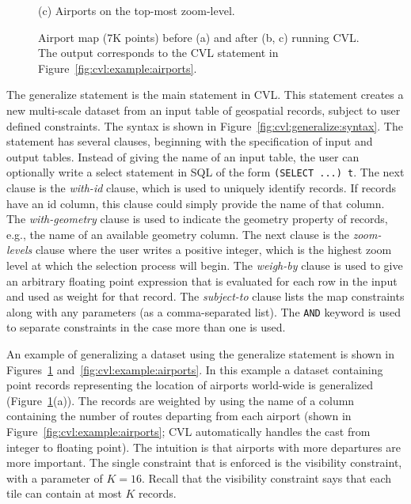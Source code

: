 \documentclass[11pt, oneside]{report}
\begin{document}
\begin{figure}[tb]
\begin{minipage}{0.329\linewidth}
    \centerline{(c) Airports on the top-most zoom-level.}
  \end{minipage}
  \vspace{-0ex}
  \caption{Airport map (7K points) before (a) and after (b, c) running CVL. The output corresponds to the CVL statement in Figure~\ref{fig:cvl:example:airports}.}
  \label{fig:cvl:visualization:airport}
  \vspace{-2ex}
\end{figure}

The generalize statement is the main statement in CVL. This statement creates a new multi-scale dataset from an input table of geospatial records, subject to user defined constraints. The syntax is shown in Figure~\ref{fig:cvl:generalize:syntax}. The statement has several clauses, beginning with the specification of input and output tables. Instead of giving the name of an input table, the user can optionally write a select statement in SQL of the form \texttt{(SELECT ...) t}. The next clause is the \emph{with-id} clause, which is used to uniquely identify records. If records have an id column, this clause could simply provide the name of that column. The \emph{with-geometry} clause is used to indicate the geometry property of records, e.g., the name of an available geometry column. The next clause is the \emph{zoom-levels} clause where the user writes a positive integer, which is the highest zoom level at which the selection process will begin. The \emph{weigh-by} clause is used to give an arbitrary floating point expression that is evaluated for each row in the input and used as weight for that record. The \emph{subject-to} clause lists the map constraints along with any parameters (as a comma-separated list). The \texttt{AND} keyword is used to separate constraints in the case more than one is used.



An example of generalizing a dataset using the generalize statement is shown in Figures~\ref{fig:cvl:visualization:airport} and~\ref{fig:cvl:example:airports}. In this example a dataset containing point records representing the location of airports world-wide is generalized (Figure~\ref{fig:cvl:visualization:airport}(a)). The records are weighted by using the name of a column containing the number of routes departing from each airport (shown in Figure~\ref{fig:cvl:example:airports}; CVL automatically handles the cast from integer to floating point). The intuition is that airports with more departures are more important. The single constraint that is enforced is the visibility constraint, with a parameter of $K=16$. Recall that the visibility constraint says that each tile can contain at most $K$ records.
\end{document}
